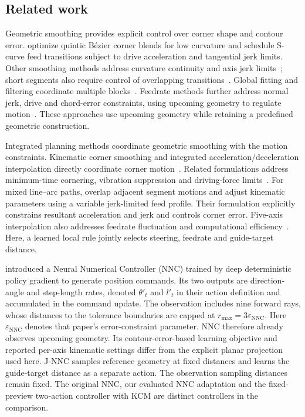 \documentclass[preprint,12pt,nonatbib]{elsarticle}
\begin{document}
\subsection{Related work}
Geometric smoothing provides explicit control over corner shape and contour error. \citet{Sencer2014} optimize quintic B\'ezier corner blends for low curvature and schedule S-curve feed transitions subject to drive acceleration and tangential jerk limits. Other smoothing methods address curvature continuity and axis jerk limits~\citep{Fan2015,Zhang2018}; short segments also require control of overlapping transitions~\citep{Hu2024,Yan2023}. Global fitting and filtering coordinate multiple blocks~\citep{Song2021,Yang2015}. Feedrate methods further address normal jerk, drive and chord-error constraints, using upcoming geometry to regulate motion~\citep{Zhang2021,Wu2022,Tsai2010,Song2020,Zhao2013}. These approaches use upcoming geometry while retaining a predefined geometric construction.

Integrated planning methods coordinate geometric smoothing with the motion constraints. Kinematic corner smoothing and integrated acceleration/deceleration interpolation directly coordinate corner motion~\citep{Tajima2016,Tsai2016}. Related formulations address minimum-time cornering, vibration suppression and driving-force limits~\citep{Duan2016,Sencer2015,LiDriving2017}. For mixed line--arc paths, \citet{Li2023} overlap adjacent segment motions and adjust kinematic parameters using a variable jerk-limited feed profile. Their formulation explicitly constrains resultant acceleration and jerk and controls corner error. Five-axis interpolation also addresses feedrate fluctuation and computational efficiency~\citep{Sun2024}. Here, a learned local rule jointly selects steering, feedrate and guide-target distance.

\citet{Li2020} introduced a Neural Numerical Controller (NNC) trained by deep deterministic policy gradient to generate position commands. Its two outputs are direction-angle and step-length rates, denoted $\theta'_t$ and $l'_t$ in their action definition and accumulated in the command update. The observation includes nine forward rays, whose distances to the tolerance boundaries are capped at $r_{\max}=3\varepsilon_{\mathrm{NNC}}$. Here $\varepsilon_{\mathrm{NNC}}$ denotes that paper's error-constraint parameter. NNC therefore already observes upcoming geometry. Its contour-error-based learning objective and reported per-axis kinematic settings differ from the explicit planar projection used here. J-NNC samples reference geometry at fixed distances and learns the guide-target distance as a separate action. The observation sampling distances remain fixed. The original NNC, our evaluated NNC adaptation and the fixed-preview two-action controller with KCM are distinct controllers in the comparison.
\end{document}
